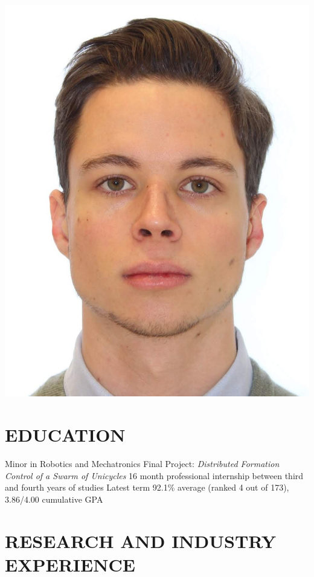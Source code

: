 \documentclass{ResumeTemplate}
\begin{document}
	\noindent\begin{minipage}[c]{0.2\linewidth}
		\centering
		\includegraphics[width=0.9\linewidth]{me}
	\end{minipage}
	
	\section{EDUCATION}
	
	\workitemsfour
	{Minor in Robotics and Mechatronics}
	{Final Project: \textit{Distributed Formation Control of a Swarm of Unicycles}}
	{16 month professional internship between third and fourth years of studies}
	{Latest term 92.1\% average (ranked 4 out of 173), 3.86/4.00 cumulative GPA}
	
	\section{RESEARCH AND INDUSTRY EXPERIENCE}
	
\end{document}
